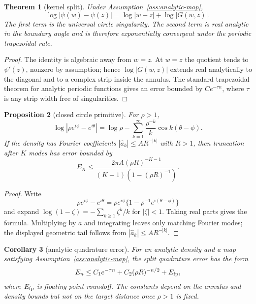 \documentclass[10pt,leqno]{article}
\numberwithin{equation}{section}
\theoremstyle{plain}
\newtheorem{theorem}{Theorem}[section]
\newtheorem{proposition}[theorem]{Proposition}
\newtheorem{corollary}[theorem]{Corollary}
\theoremstyle{definition}
\theoremstyle{remark}
\begin{document}
\begin{theorem}[kernel split]\label{thm:kernel-split}
Under Assumption~\ref{ass:analytic-map},
\begin{equation}
\log|\psi(w)-\psi(z)|=\log|w-z|+\log|G(w,z)|.
\end{equation}
The first term is the universal circle singularity.  The second term is real analytic in the boundary angle and is therefore exponentially convergent under the periodic trapezoidal rule.
\end{theorem}
\begin{proof}
The identity is algebraic away from $w=z$.  At $w=z$ the quotient tends to $\psi'(z)$, nonzero by assumption; hence $\log|G(w,z)|$ extends real analytically to the diagonal and to a complex strip inside the annulus.  The standard trapezoidal theorem for analytic periodic functions gives an error bounded by $C e^{-\tau n}$, where $\tau$ is any strip width free of singularities.
\end{proof}

\begin{proposition}[closed circle primitive]\label{prop:circle-primitive}
For $\rho>1$,
\begin{equation}
\log|\rho e^{i\phi}-e^{i\theta}|
=\log\rho-\sum_{k=1}^\infty \frac{\rho^{-k}}{k}\cos k(\theta-\phi).
\end{equation}
If the density has Fourier coefficients $|\widehat a_k|\le A R^{-|k|}$ with $R>1$, then truncation after $K$ modes has error bounded by
\begin{equation}
E_K\le \frac{2\pi A(\rho R)^{-K-1}}{(K+1)(1-(\rho R)^{-1})}.
\end{equation}
\end{proposition}
\begin{proof}
Write
\[
\rho e^{i\phi}-e^{i\theta}=\rho e^{i\phi}\{1-\rho^{-1}e^{i(\theta-\phi)}\}
\]
and expand $\log(1-\zeta)=-\sum_{k\ge1}\zeta^k/k$ for $|\zeta|<1$.  Taking real parts gives the formula.  Multiplying by $a$ and integrating leaves only matching Fourier modes; the displayed geometric tail follows from $|\widehat a_k|\le A R^{-|k|}$.
\end{proof}

\begin{corollary}[analytic quadrature error]\label{cor:analytic-error}
For an analytic density and a map satisfying Assumption~\ref{ass:analytic-map}, the split quadrature error has the form
\begin{equation}
E_n \le C_1 e^{-\tau n}+C_2(\rho R)^{-n/2}+E_{\rm fp},
\end{equation}
where $E_{\rm fp}$ is floating point roundoff.  The constants depend on the annulus and density bounds but not on the target distance once $\rho>1$ is fixed.
\end{corollary}
\end{document}
